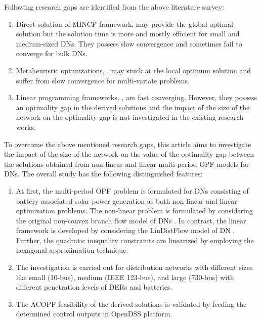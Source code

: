\documentclass{article}
\begin{document}
Following research gaps are identified from the above literature survey:
\begin{enumerate}
    \item Direct solution of MINCP framework, \cite{Gabash, Safdarian, Jha} may provide the global optimal solution but the solution time is more and mostly efficient for small and medium-sized DNs. They possess slow convergence and sometimes fail to converge for bulk DNs.
    \item Metaheuristic optimizations, \cite{Mohapatra, Padilha-Feltrin, Liu}, may stuck at the local optimum solution and suffer from slow convergence for multi-variate problems.
    \item Linear programming frameworks, \cite{Li, Lei, spaul, Yang, Vaishya}, are fast converging. However, they possess an optimality gap in the derived solutions and the impact of the size of the network on the optimality gap is not investigated in the existing research works.
\end{enumerate}
To overcome the above mentioned research gaps, this article aims to investigate the impact of the size of the network on the value of the optimality gap between the solutions obtained from non-linear and linear multi-period OPF models for DNs. The overall study has the following distinguished features:
\begin{enumerate}
    \item At first, the multi-period OPF problem is formulated for DNs consisting of battery-associated solar power generation as both non-linear and linear optimization problems. The non-linear problem is formulated by considering the original non-convex branch flow model of DNs \cite{Farivar1}. In contrast, the linear framework is developed by considering the LinDistFlow model of DN \cite{Gan}. Further, the quadratic inequality constraints are linearized by employing the hexagonal approximation technique. 
    \item The investigation is carried out for distribution networks with different sizes like small (10-bus), medium (IEEE 123-bus), and large (730-bus) with different penetration levels of DERs and batteries. 
    \item The ACOPF feasibility of the derived solutions is validated by feeding the determined control outputs in OpenDSS platform. 
\end{enumerate}
\end{document}
